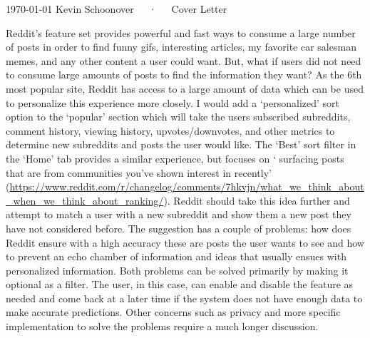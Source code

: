 \documentclass[11pt, letterpaper]{awesome-cv}
\begin{document}
\makecvheader

\makecvfooter
  {\today}
  {Kevin Schoonover~~~·~~~Cover Letter}
  {}

\makelettertitle

\begin{cvletter}

Reddit's feature set provides powerful and fast ways to consume a large number of
posts in order to find funny gifs, interesting articles, my favorite car
salesman memes, and any other content a user could want. But, what if users did not
need to consume large amounts of posts to find the information they want? As the
6th most popular site, Reddit has access to a large amount of data which can be
used to personalize this experience more closely. I would add a `personalized'
sort option to the `popular' section which will take the users subscribed
subreddits, comment history, viewing history, upvotes/downvotes, and other
metrics to determine new subreddits and posts the user would like. The `Best' sort
filter in the `Home' tab provides a similar experience, but focuses on `
surfacing posts that are from communities you’ve shown interest in recently'
(\url{https://www.reddit.com/r/changelog/comments/7hkvjn/what_we_think_about_when_we_think_about_ranking/}).
Reddit should take this idea further and attempt to match a user with a new
subreddit and show them a new post they have not considered before. The suggestion
has a couple of problems: how does Reddit ensure with a high accuracy these are
posts the user wants to see and how to prevent an echo chamber of information
and ideas that usually ensues with personalized information. Both problems can
be solved primarily by making it optional as a filter. The user, in this case,
can enable and disable the feature as needed and come back at a later time if
the system does not have enough data to make accurate predictions. Other
concerns such as privacy and more specific implementation to solve the
problems require a much longer discussion.


\end{cvletter}
\end{document}
